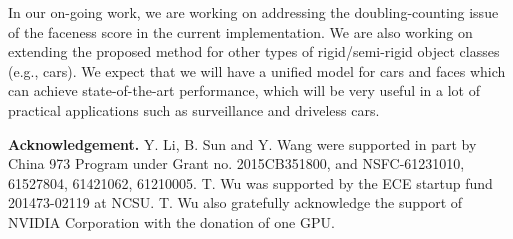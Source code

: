 \documentclass[runningheads]{llncs}
\begin{document}
In our on-going work, we are working on addressing the doubling-counting issue of the faceness score in the current implementation. We are also working on extending the proposed method for other types of rigid/semi-rigid object classes (e.g., cars). We expect that we will have a unified model for cars and faces which can achieve state-of-the-art performance, which will be very useful in a lot of practical applications such as surveillance and driveless cars.


\textbf{Acknowledgement.}  Y. Li, B. Sun and Y. Wang were supported in part by China 973 Program under Grant no. 2015CB351800, and NSFC-61231010, 61527804, 61421062, 61210005. T. Wu was supported by the ECE startup fund  201473-02119 at NCSU. T. Wu also gratefully acknowledge the support of NVIDIA Corporation with the donation of one GPU.



\end{document}

